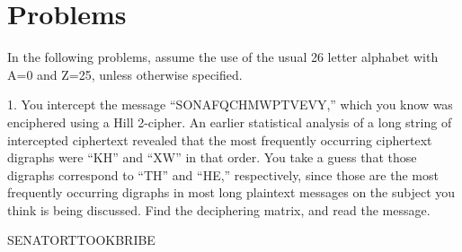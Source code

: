 \section{Problems}
In the following problems, assume the use of the usual 26 letter alphabet with A=0 and Z=25, unless otherwise specified.


1. You intercept the message “SONAFQCHMWPTVEVY,” which you know was enciphered using a Hill 2-cipher. 
An earlier statistical analysis of a long string of intercepted ciphertext revealed that the most frequently occurring ciphertext digraphs were “KH” and “XW” in that order. 
You take a guess that those digraphs correspond to “TH” and “HE,” respectively, since those are the most frequently occurring digraphs in most long plaintext messages on the subject you think is being discussed.
Find the deciphering matrix, and read the message.

SENATORTTOOKBRIBE



